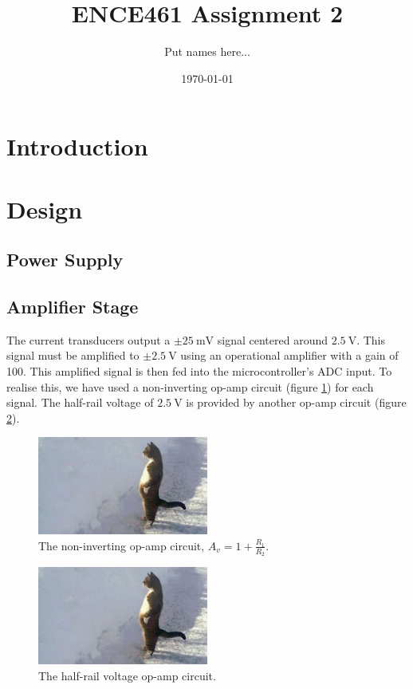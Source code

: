 \documentclass[12pt]{article}
\title{ENCE461 Assignment 2}
\author{Put names here...}
\date{\today}
\begin{document}
\maketitle

\section{Introduction}





\section{Design}


\subsection{Power Supply}




\subsection{Amplifier Stage}

The current transducers output a $\pm \SI{25}{\milli\volt}$ signal centered around $\SI{2.5}{\volt}$.
This signal must be amplified to $\pm \SI{2.5}{\volt}$ using an operational amplifier with a gain of 100.
This amplified signal is then fed into the microcontroller's ADC input.
To realise this, we have used a non-inverting op-amp circuit (figure \ref{fig:non-inverting-op-amp}) for each signal.
The half-rail voltage of $\SI{2.5}{\volt}$ is provided by another op-amp circuit (figure \ref{fig:half-supply}).

\begin{figure}[H]
	\centering
	\includegraphics[width=0.5\textwidth]{cat}
	\caption{The non-inverting op-amp circuit, $A_v = 1 + \frac{R_1}{R_2}$.}
	\label{fig:non-inverting-op-amp}
\end{figure}

\begin{figure}[H]
	\centering
	\includegraphics[width=0.5\textwidth]{cat}
	\caption{The half-rail voltage op-amp circuit.}
	\label{fig:half-supply}
\end{figure}
\end{document}
